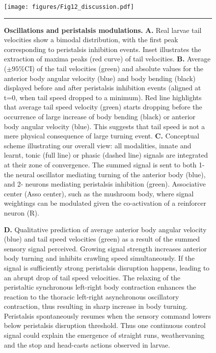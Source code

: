 \documentclass[11pt,a4paper]{article}
\begin{document}
\begin{figure}
\begin{center}
\texttt{[image: figures/Fig12\_discussion.pdf]}
\caption{{\bf Oscillations and peristalsis modulations.} {\bf A.} Real larvae tail velocities show a bimodal distribution, with the first peak corresponding to peristalsis inhibition events. Inset illustrates the extraction of maxima peaks (red curve) of tail velocities.
{\bf B.} Average ($\pm 95\%$CI) of the tail velocities (green) and absolute values for the anterior body angular velocity (blue) and body bending (black) displayed before and after peristalsis inhibition events (aligned at t=0, when tail speed dropped to a minimum). Red line highlights that average tail speed velocity (green) starts dropping before the occurrence of large increase of body bending (black) or anterior body angular velocity (blue). This suggests that tail speed is not a mere physical consequence of large turning event.
{\bf C.} Conceptual scheme illustrating our overall view: all modalities, innate and learnt, tonic (full line) or phasic (dashed line) signals are integrated at their zone of convergence. The summed signal is sent to both 1-the  neural oscillator mediating turning of the anterior body (blue), and 2- neurons mediating peristalsis inhibition (green).  Associative center (Asso center), such as the mushroom body, where signal weightings can be modulated given the co-activation of a reinforcer neuron (R).
\label{fig:Peristalsis}}
\hrule
\end{center}
\end{figure}


\begin{figure}
\ContinuedFloat
\caption{
{\bf D.} Qualitative prediction of average anterior body angular velocity (blue) and tail speed velocities (green) as a result of the summed sensory signal perceived. Growing signal strength increases anterior body turning and inhibits crawling speed simultaneously. If the signal is sufficiently strong peristalsis disruption happens, leading to an abrupt drop of tail speed velocities. The relaxing of the  peristaltic synchronous left-right body contraction enhances the reaction to the thoracic left-right asynchronous oscillatory contraction, thus resulting in sharp increase in body turning. Peristalsis spontaneously resumes when the sensory command lowers below peristalsis disruption threshold. Thus one continuous control signal could explain the emergence of straight runs, weathervaning and the stop and head-casts actions observed in larvae.
}
\end{figure}
\end{document}
